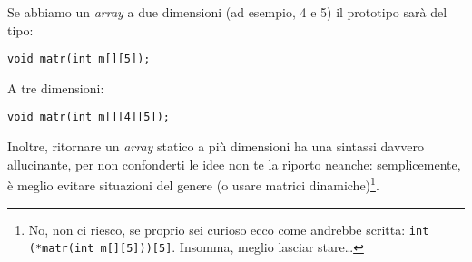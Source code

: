 Se abbiamo un \emph{array} a due dimensioni (ad esempio, 4 e 5) il prototipo sarà del tipo:
\begin{lstlisting}
void matr(int m[][5]);
\end{lstlisting}

A tre dimensioni:
\begin{lstlisting}
void matr(int m[][4][5]);
\end{lstlisting}

Inoltre, ritornare un \emph{array} statico a più dimensioni ha una sintassi davvero allucinante, per non confonderti le idee non te la riporto neanche: semplicemente, è meglio evitare situazioni del genere (o usare matrici dinamiche)\footnote{No, non ci riesco, se proprio sei curioso ecco come andrebbe scritta: \lstinline|int (*matr(int m[][5]))[5]|. Insomma, meglio lasciar stare\ldots}.\\


